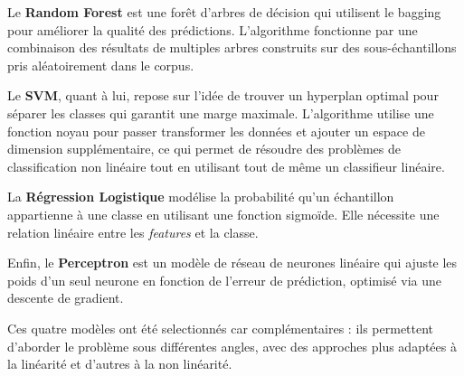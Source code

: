 \par Le \textbf{Random Forest} est une forêt d'arbres de décision qui utilisent le bagging pour améliorer la qualité des prédictions. L'algorithme fonctionne par une combinaison des résultats de multiples arbres construits sur des sous-échantillons pris aléatoirement dans le corpus.

\par Le \textbf{SVM}, quant à lui, repose sur l'idée de trouver un hyperplan optimal pour séparer les classes qui garantit une marge maximale. L'algorithme utilise une fonction noyau pour passer transformer les données et ajouter un espace de dimension supplémentaire, ce qui permet de résoudre des problèmes de classification non linéaire tout en utilisant tout de même un classifieur linéaire.

\par La \textbf{Régression Logistique} modélise la probabilité qu'un échantillon appartienne à une classe en utilisant une fonction sigmoïde. Elle nécessite une relation linéaire entre les \textit{features} et la classe.

\par Enfin, le \textbf{Perceptron} est un modèle de réseau de neurones linéaire qui ajuste les poids d'un seul neurone en fonction de l'erreur de prédiction, optimisé via une descente de gradient.

\par Ces quatre modèles ont été selectionnés car complémentaires : ils permettent d'aborder le problème sous différentes angles, avec des approches plus adaptées à la linéarité et d'autres à la non linéarité.



